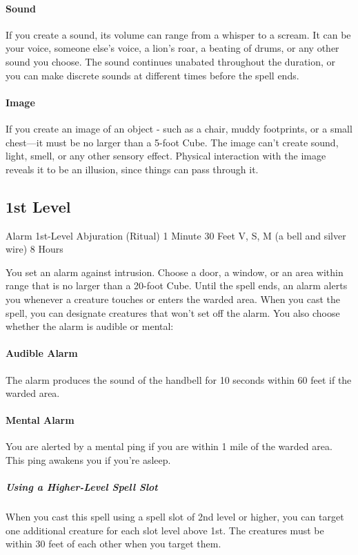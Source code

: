 \documentclass[letterpaper,openany,oneside,twocolumn]{book}
\begin{document}
\paragraph*{Sound} If you create a sound, its volume can range from a whisper to a scream. It can be your voice, someone else's voice, a lion's roar, a beating of drums, or any other sound you choose. The sound continues unabated throughout the duration, or you can make discrete sounds at different times before the spell ends.

\paragraph*{Image} If you create an image of an object - such as a chair, muddy footprints, or a small chest—it must be no larger than a 5-foot Cube. The image can't create sound, light, smell, or any other sensory effect. Physical interaction with the image reveals it to be an illusion, since things can pass through it.

\subsection*{1st Level}

\DndSpellHeader
  {Alarm}
  {1st-Level Abjuration (Ritual)}
  {1 Minute}
  {30 Feet}
  {V, S, M (a bell and silver wire)}
  {8 Hours}

You set an alarm against intrusion. Choose a door, a window, or an area within range that is no larger than a 20-foot Cube. Until the spell ends, an alarm alerts you whenever a creature touches or enters the warded area. When you cast the spell, you can designate creatures that won't set off the alarm. You also choose whether the alarm is audible or mental:
\paragraph*{Audible Alarm} The alarm produces the sound of the handbell for 10 seconds within 60 feet if the warded area.
\paragraph*{Mental Alarm} You are alerted by a mental ping if you are within 1 mile of the warded area. This ping awakens you if you're asleep.

\subparagraph*{Using a Higher-Level Spell Slot} When you cast this spell using a spell slot of 2nd level or higher, you can target one additional creature for each slot level above 1st. The creatures must be within 30 feet of each other when you target them.
\end{document}
